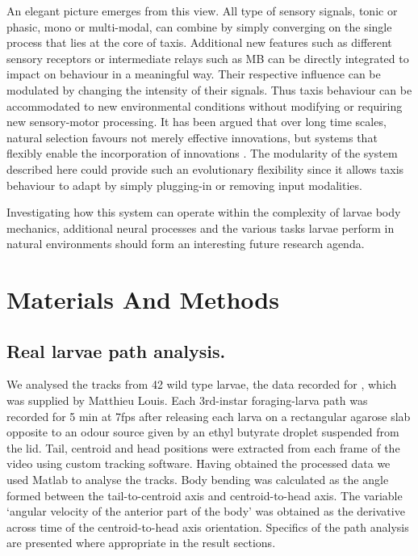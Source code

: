 \documentclass[11pt,a4paper]{article}
\begin{document}
An elegant picture emerges from this view. All type of sensory signals, tonic or phasic, mono or multi-modal, can combine by simply converging on the single process that lies at the core of taxis. Additional new features such as different sensory receptors or intermediate relays such as MB can be directly integrated to impact on behaviour in a meaningful way. Their respective influence can be modulated by changing the intensity of their signals. Thus taxis behaviour can be accommodated to new environmental conditions without modifying or requiring new sensory-motor processing. It has been argued that over long time scales, natural selection favours not merely effective innovations, but systems that flexibly enable the incorporation of innovations \citep{vermeij1973adaptation}. The modularity of the system described here could provide such an evolutionary flexibility since it allows taxis behaviour to adapt by simply plugging-in or removing input modalities.

Investigating how this system can operate within the complexity of larvae body mechanics, additional neural processes and the various tasks larvae perform in natural environments should form an interesting future research agenda.

\section{Materials And Methods}
\subsection{Real larvae path analysis.}
We analysed the tracks from 42 wild type larvae, the data recorded for \cite{gomez2011active}, which was supplied by Matthieu Louis. Each 3rd-instar foraging-larva path was recorded for 5 min at 7fps after releasing each larva on a rectangular agarose slab opposite to an odour source given by an ethyl butyrate droplet suspended from the lid.
 Tail, centroid and head positions were extracted from each frame of the video using custom tracking software.
 Having obtained the processed data we used Matlab to analyse the tracks.
  Body bending was calculated as the angle formed between the tail-to-centroid axis and centroid-to-head axis. The variable ‘angular velocity of the anterior part of the body’ was obtained as the derivative across time of the centroid-to-head axis orientation. Specifics of the path analysis are presented where appropriate in the result sections. 
\end{document}

